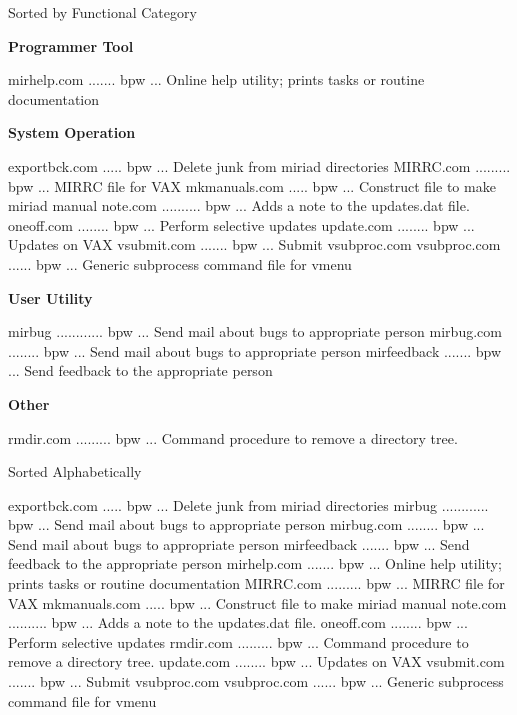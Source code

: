 \beginsection Sorted by Functional Category
\par\centerline {\bf Programmer Tool}
\par{\eightpoint\begintt
mirhelp.com ....... bpw  ... Online help utility; prints tasks or routine documentation
\endtt}
\par\centerline {\bf System Operation}
\par{\eightpoint\begintt
exportbck.com ..... bpw  ... Delete junk from miriad directories
MIRRC.com ......... bpw  ... MIRRC file for VAX
mkmanuals.com ..... bpw  ... Construct file to make miriad manual
note.com .......... bpw  ... Adds a note to the updates.dat file.
oneoff.com ........ bpw  ... Perform selective updates
\endtt}
{\eightpoint\begintt
update.com ........ bpw  ... Updates on VAX
vsubmit.com ....... bpw  ... Submit vsubproc.com
vsubproc.com ...... bpw  ... Generic subprocess command file for vmenu
\endtt}
\par\centerline {\bf User Utility}
\par{\eightpoint\begintt
mirbug ............ bpw  ... Send mail about bugs to appropriate person
mirbug.com ........ bpw  ... Send mail about bugs to appropriate person
mirfeedback ....... bpw  ... Send feedback to the appropriate person
\endtt}
\par\centerline {\bf Other}
\par{\eightpoint\begintt
rmdir.com ......... bpw  ... Command procedure to remove a directory tree.
\endtt}

\beginsection Sorted Alphabetically
\par{\eightpoint\begintt
exportbck.com ..... bpw  ... Delete junk from miriad directories
mirbug ............ bpw  ... Send mail about bugs to appropriate person
mirbug.com ........ bpw  ... Send mail about bugs to appropriate person
mirfeedback ....... bpw  ... Send feedback to the appropriate person
mirhelp.com ....... bpw  ... Online help utility; prints tasks or routine documentation
\endtt}
{\eightpoint\begintt
MIRRC.com ......... bpw  ... MIRRC file for VAX
mkmanuals.com ..... bpw  ... Construct file to make miriad manual
note.com .......... bpw  ... Adds a note to the updates.dat file.
oneoff.com ........ bpw  ... Perform selective updates
rmdir.com ......... bpw  ... Command procedure to remove a directory tree.
\endtt}
{\eightpoint\begintt
update.com ........ bpw  ... Updates on VAX
vsubmit.com ....... bpw  ... Submit vsubproc.com
vsubproc.com ...... bpw  ... Generic subprocess command file for vmenu
\endtt}

\endchapter

